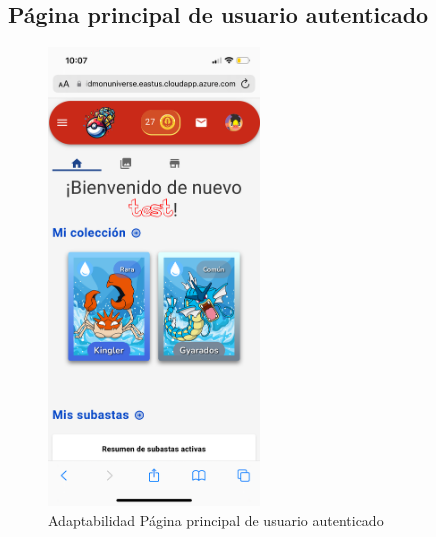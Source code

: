 \subsection*{Página principal de usuario autenticado}
\begin{figure}[H]
    \centering
    \includegraphics[width=0.5\textwidth]{figures/adaptabilidad/logued.png}
    \caption{Adaptabilidad Página principal de usuario autenticado}
    \label{fig:Adap-Principal-Usuario}
\end{figure}

